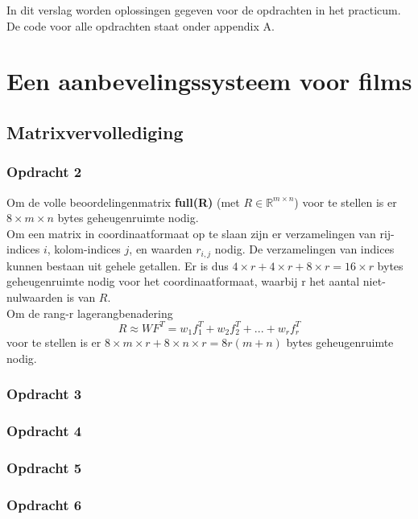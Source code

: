 \documentclass[11pt, a4paper, titlepage, openright]{article}
\begin{document}

\tableofcontents
\newpage

\noindent In dit verslag worden oplossingen gegeven voor de opdrachten in het practicum. 
De code voor alle opdrachten staat onder appendix A.

\section{Een aanbevelingssysteem voor films}
	\subsection{Matrixvervollediging}
	
	\subsubsection{Opdracht 2}		
    Om de volle beoordelingenmatrix \textbf{full(R)} (met \( R \in \mathbb{R}^{m \times n} \)) voor te stellen 
    is er \( 8 \times m \times n \) bytes geheugenruimte nodig. \\

    Om een matrix in coordinaatformaat op te slaan zijn er verzamelingen van rij-indices \(i\),
    kolom-indices \(j\), en waarden \( r_{i,j} \) nodig. De verzamelingen van indices kunnen bestaan
    uit gehele getallen. Er is dus \( 4 \times r + 4 \times r + 8 \times r = 16 \times r \) bytes
    geheugenruimte nodig voor het coordinaatformaat, waarbij r het aantal niet-nulwaarden is van \( R\). \\

    Om de rang-r lagerangbenadering 
    \[ R \approx WF^T = w_1 f_1^T + w_2 f_2^T + ... + w_r f_r^T \]
    voor te stellen is er \( 8 \times m \times r + 8 \times n \times r = 8r (m + n) \) bytes geheugenruimte nodig.

	\subsubsection{Opdracht 3}

	\subsubsection{Opdracht 4}

	\subsubsection{Opdracht 5}

	\subsubsection{Opdracht 6}
\end{document}

